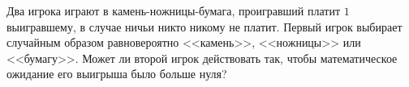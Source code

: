 Два игрока играют в камень-ножницы-бумага, проигравший платит $1$ выигравшему, в случае ничьи никто
никому не платит. Первый игрок выбирает случайным образом равновероятно <<камень>>, <<ножницы>> или
<<бумагу>>. Может ли второй игрок действовать так, чтобы математическое ожидание его выигрыша было больше
нуля?
